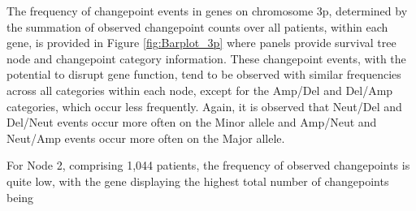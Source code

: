 The frequency of changepoint events in genes on chromosome 3p, determined by the summation of observed changepoint counts over all patients, within each gene, is provided in Figure \ref{fig:Barplot_3p} where panels provide survival tree node and changepoint category information. These changepoint events, with the potential to disrupt gene function, tend to be observed with similar frequencies across all categories within each node, except for the Amp/Del and Del/Amp categories, which occur less frequently. Again, it is observed that Neut/Del and Del/Neut events occur more often on the Minor allele and Amp/Neut and Neut/Amp events occur more often on the Major allele. 

For Node 2, comprising 1,044 patients, the frequency of observed changepoints is quite low, with the gene displaying the highest total number of changepoints being 

